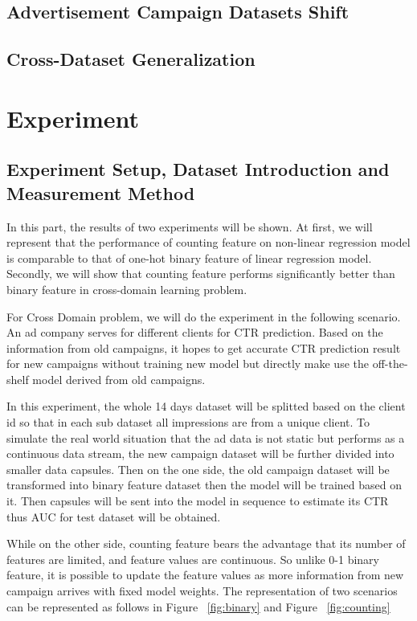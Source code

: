 \documentclass{sig-alternate}
\begin{document}
\subsection{Advertisement Campaign Datasets Shift}

\subsection{Cross-Dataset Generalization}



\section{Experiment}

\subsection{Experiment Setup, Dataset Introduction and Measurement Method}

In this part, the results of two experiments will be shown. At first, we will represent that the performance of counting feature on non-linear regression model is comparable to that of one-hot binary feature of linear regression model. Secondly, we will show that counting feature performs significantly better than binary feature in cross-domain learning problem. 

For Cross Domain problem, we will do the experiment in the following scenario. An ad company serves for different clients for CTR prediction. Based on the information from old campaigns, it hopes to get accurate CTR prediction result for new campaigns without training new model but directly make use the off-the-shelf model derived from old campaigns. \vspace{5mm}

In this experiment, the whole 14 days dataset will be splitted based on the client id so that in each sub dataset all impressions are from a unique client. To simulate the real world situation that the ad data is not static but performs as a continuous data stream, the new campaign dataset will be further divided into smaller data capsules. Then on the one side, the old campaign dataset will be transformed into binary feature dataset then the model will be trained based on it. Then capsules will be sent into the model in sequence to estimate its CTR thus AUC for test dataset will be obtained. \vspace{5mm}

While on the other side, counting feature bears the advantage that its number of features are limited, and feature values are continuous. So unlike 0-1 binary feature, it is possible to update the feature values as more information from new campaign arrives with fixed model weights. The representation of two scenarios can be represented as follows in Figure ~\ref{fig:binary} and Figure ~\ref{fig:counting}
\end{document}
